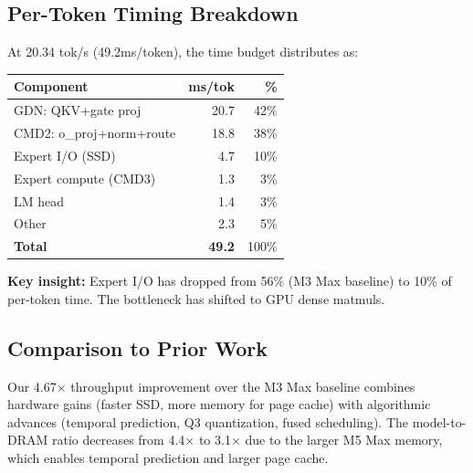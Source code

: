 \documentclass[11pt,twocolumn]{article}
\begin{document}
\subsection{Per-Token Timing Breakdown}

At 20.34 tok/s (49.2ms/token), the time budget distributes as:

\begin{center}
\small
\begin{tabular}{lrr}
\toprule
\textbf{Component} & \textbf{ms/tok} & \textbf{\%} \\
\midrule
GDN: QKV+gate proj & 20.7 & 42\% \\
CMD2: o\_proj+norm+route & 18.8 & 38\% \\
Expert I/O (SSD) & 4.7 & 10\% \\
Expert compute (CMD3) & 1.3 & 3\% \\
LM head & 1.4 & 3\% \\
Other & 2.3 & 5\% \\
\midrule
\textbf{Total} & \textbf{49.2} & 100\% \\
\bottomrule
\end{tabular}
\end{center}

\textbf{Key insight:} Expert I/O has dropped from 56\% (M3 Max baseline) to 10\% of per-token time. The bottleneck has shifted to GPU dense matmuls.

\subsection{Comparison to Prior Work}

\begin{center}
\end{center}

Our 4.67$\times$ throughput improvement over the M3 Max baseline combines hardware gains (faster SSD, more memory for page cache) with algorithmic advances (temporal prediction, Q3 quantization, fused scheduling). The model-to-DRAM ratio decreases from 4.4$\times$ to 3.1$\times$ due to the larger M5 Max memory, which enables temporal prediction and larger page cache.
\end{document}
